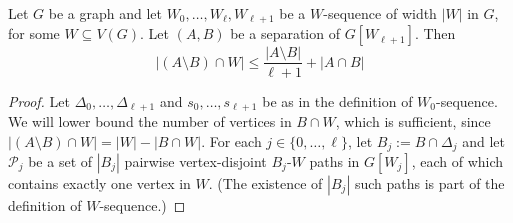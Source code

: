 \documentclass{patmorin}
\begin{document}
\begin{lem}\label{uniform_balance}
  Let $G$ be a graph and let $W_0,\ldots,W_{\ell},W_{\ell+1}$ be a $W$-sequence of width $|W|$ in $G$, for some $W\subseteq V(G)$. Let $(A,B)$ be a separation of $G[W_{\ell+1}]$. Then
  \[
     |(A\setminus B)\cap W| \le \frac{|A\setminus B|}{\ell+1} + |A\cap B|
  \]
\end{lem}

\begin{proof}
  Let $\Delta_0,\ldots,\Delta_{\ell+1}$ and $s_0,\ldots,s_{\ell+1}$ be as in the definition of $W_0$-sequence.
  We will lower bound the number of vertices in $B\cap W$, which is sufficient, since $|(A\setminus B)\cap W|=|W|-|B\cap W|$.  For each $j\in\{0,\ldots,\ell\}$, let $B_j:=B\cap \Delta_j$ and let $\mathcal{P}_j$ be a set of $|B_j|$ pairwise vertex-disjoint $B_j$-$W$ paths in $G[W_j]$, each of which contains exactly one vertex in $W$.  (The existence of $|B_j|$ such paths is part of the definition of $W$-sequence.)  
  

\end{proof}
\end{document}
